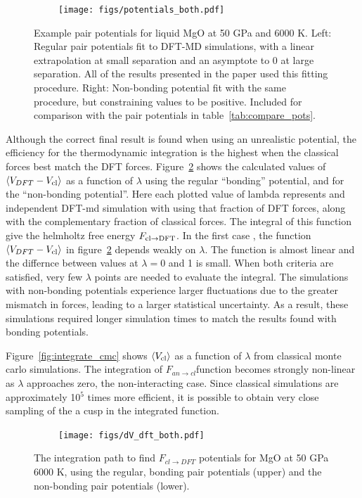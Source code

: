 \begin{figure}[h!]  
    \centering
    \texttt{[image: figs/potentials\_both.pdf]}
\caption{Example pair potentials for liquid MgO at 50 GPa and 6000 K. Left: 
  Regular pair potentials fit to DFT-MD simulations, with a linear
  extrapolation at small separation and an asymptote to 0 at large
  separation.  All of the results presented in the paper used this fitting
  procedure. Right: Non-bonding potential fit with the same procedure, but
  constraining values to be positive. Included for comparison with the pair
  potentials in table~\ref{tab:compare_pots}.}
\label{fig:potentials}
\end{figure}


Although the correct final result is found when using an unrealistic
potential, the efficiency for the thermodynamic integration is the highest
when the classical forces best match the DFT forces.
Figure~\ref{fig:integrate_dft} shows the calculated values of $\left<
V_{DFT} - V_{\rm cl} \right>$ as a function of $\lambda$ using the regular
``bonding'' potential, and for the ``non-bonding potential''. Here each
plotted value of lambda represents and independent DFT-md simulation with
using that fraction of DFT forces, along with the complementary fraction of
classical forces. The integral of this function give the helmholtz free
energy $F_{\rm cl \to DFT}$. In the first case , the function $\left<
V_{DFT}-V_{\rm cl}\right>$ in figure~\ref{fig:integrate_dft} depends weakly
on $\lambda$. The function is almost linear and the differnce between
values at $\lambda=0$ and 1 is small. When both criteria are satisfied,
very few $\lambda$ points are needed to evaluate the integral. The
simulations with non-bonding potentials experience larger fluctuations  due
to the greater mismatch in forces, leading to a larger statistical
uncertainty.  As a result, these simulations required longer simulation
times to match the results found with bonding potentials.

Figure~\ref{fig:integrate_cmc} shows $\left< V_{\rm cl} \right>$ as a function
of $\lambda$ from classical monte carlo simulations. The integration of
$F_{an \to cl}$function becomes strongly non-linear as $\lambda$
approaches zero, the non-interacting case. Since classical simulations are
approximately 10$^5$ times more efficient, it is possible to obtain very
close sampling of the a cusp in the integrated function. 

\begin{figure}[h!]  
  \centering
    \texttt{[image: figs/dV\_dft\_both.pdf]}
\caption{The integration path to find $F_{cl \to DFT}$ potentials for MgO
at 50 GPa 6000 K, using the regular, bonding pair potentials (upper) and
the non-bonding pair potentials (lower). }
\label{fig:integrate_dft}
\end{figure}

